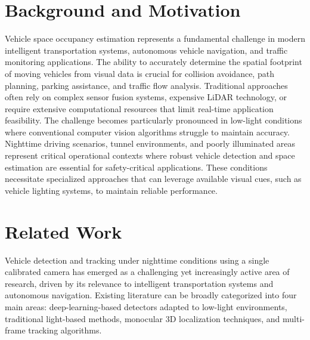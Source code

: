 \section{Background and Motivation}
Vehicle space occupancy estimation represents a fundamental challenge in modern intelligent transportation systems, autonomous vehicle navigation, and traffic monitoring applications. The ability to accurately determine the spatial footprint of moving vehicles from visual data is crucial for collision avoidance, path planning, parking assistance, and traffic flow analysis. Traditional approaches often rely on complex sensor fusion systems, expensive LiDAR technology, or require extensive computational resources that limit real-time application feasibility.
The challenge becomes particularly pronounced in low-light conditions where conventional computer vision algorithms struggle to maintain accuracy. Nighttime driving scenarios, tunnel environments, and poorly illuminated areas represent critical operational contexts where robust vehicle detection and space estimation are essential for safety-critical applications. These conditions necessitate specialized approaches that can leverage available visual cues, such as vehicle lighting systems, to maintain reliable performance.

\section{Related Work}
Vehicle detection and tracking under nighttime conditions using a single calibrated camera has emerged as a challenging yet increasingly active area of research, driven by its relevance to intelligent transportation systems and autonomous navigation. Existing literature can be broadly categorized into four main areas: deep-learning-based detectors adapted to low-light environments, traditional light-based methods, monocular 3D localization techniques, and multi-frame tracking algorithms.

